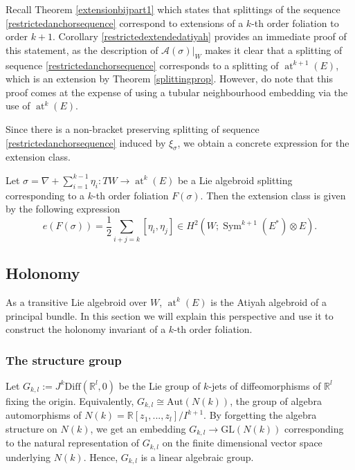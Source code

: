 \documentclass[10pt]{amsart}
\newcommand{\A}{{\mathcal{A}}}
\DeclareMathOperator{\Sym}{Sym}
\DeclareMathOperator{\at}{at}
\numberwithin{theoremalpha}{section}
\numberwithin{equation}{section}
\numberwithin{definition}{section}
\numberwithin{theorem}{section}
\numberwithin{proposition}{section}
\numberwithin{lemma}{section}
\numberwithin{example}{section}
\numberwithin{remark}{section}
\numberwithin{corollary}{section}
\numberwithin{question}{section}
\numberwithin{problem}{section}
\numberwithin{assumption}{section}
\theoremstyle{named}
\numberwithin{equation}{section}
\begin{document}
\begin{remark}
Recall Theorem \ref{extensionbijpart1} which states that splittings of the sequence \eqref{restrictedanchorsequence} correspond to extensions of a $k$-th order foliation to order $k+1$. Corollary \ref{restrictedextendedatiyah} provides an immediate proof of this statement, as the description of $\A(\sigma)|_W$ makes it clear that a splitting of sequence \eqref{restrictedanchorsequence} corresponds to a splitting of $\at^{k+1}(E)$, which is an extension by Theorem \ref{splittingprop}. However, do note that this proof comes at the expense of using a tubular neighbourhood embedding via the use of $\at^k(E)$.
\end{remark}
Since there is a non-bracket preserving splitting of sequence \eqref{restrictedanchorsequence} induced by $\xi_{\sigma}$, we obtain a concrete expression for the extension class. 
\begin{corollary}\label{cor:explicitextensionclass}
Let $\sigma = \nabla + \sum_{i = 1}^{k-1}\eta_{i} : TW \to \at^{k}(E)$ be a Lie algebroid splitting corresponding to a $k$-th order foliation $F(\sigma)$. Then the extension class is given by the following expression 
\[
e(F(\sigma)) = \frac{1}{2} \sum_{i + j = k} [\eta_{i}, \eta_{j}] \in H^2(W;\Sym^{k+1}(E^*)\otimes E). 
\]
\end{corollary}


\subsection{Holonomy}

As a transitive Lie algebroid over $W$, $\at^{k}(E)$ is the Atiyah algebroid of a principal bundle. In this section we will explain this perspective and use it to construct the holonomy invariant of a $k$-th order foliation. 

\subsubsection{The structure group} \label{structuregroup}
Let $G_{k,l} := J^{k}\mathrm{Diff}(\mathbb{R}^l, 0)$ be the Lie group of $k$-jets of diffeomorphisms of $\mathbb{R}^l$ fixing the origin. Equivalently, $G_{k,l} \cong \mathrm{Aut}(N(k))$, the group of algebra automorphisms of $N(k) = \mathbb{R}[z_{1}, ..., z_{l}]/I^{k+1}$. By forgetting the algebra structure on $N(k)$, we get an embedding $G_{k, l} \to \mathrm{GL}(N(k))$ corresponding to the natural representation of $G_{k,l}$ on the finite dimensional vector space underlying $N(k)$. Hence, $G_{k,l}$ is a linear algebraic group. 
\end{document}

